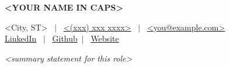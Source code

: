%
%
%



\noindent
\begin{minipage}[c]{0.45\textwidth}
    \vspace{0pt}
    {\LARGE \textbf{<YOUR NAME IN CAPS>}}
\end{minipage}%
\begin{minipage}[c]{0.55\textwidth}
    \raggedleft
    <City, ST> \ $|$ \ \href{tel:<E164PHONE>}{<(xxx) xxx xxxx>} \ $|$ \
    \href{mailto:<you@example.com>?subject=Resume\%20Enquiry}{<you@example.com>} \\
    \href{<https://www.linkedin.com/in/yourhandle>}{LinkedIn} \ $|$ \
    \href{<https://github.com/yourhandle>}{Github}\ $|$ \
    \href{<https://yoursite.com>}{Website} \\
\end{minipage}

\vspace{0.2em}

\noindent\textit{<summary statement for this role>}



